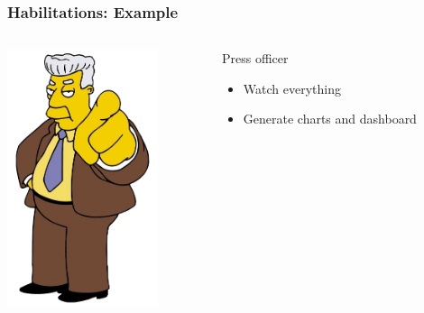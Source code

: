 \documentclass{beamer}
\begin{document}
\begin{frame}
\frametitle{Habilitations: Example}
\begin{columns}
 \begin{column}{0.45\textwidth}
         \includegraphics[height=7.5cm]{./pics/simpsons/comm_kent_brockman.png}
 \end{column}
 \begin{column}{0.45\textwidth}
    \begin{block}{Press officer}
        \begin{itemize}
            \item Watch everything
            \item Generate charts and dashboard 
        \end{itemize}
    \end{block}
 \end{column}
\end{columns}
\end{frame}
\end{document}
